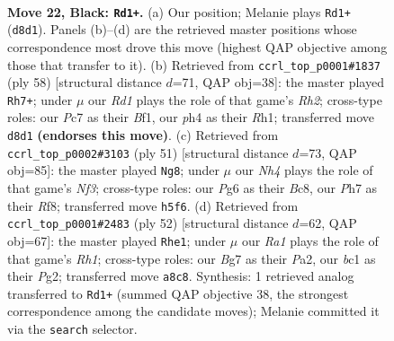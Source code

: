 \documentclass[11pt]{article}
\begin{document}
\clearpage

\begin{figure}[p]\centering
\begin{subfigure}{0.46\textwidth}\centering
\resizebox{\linewidth}{!}{%
\newchessgame
\chessboard[
  setfen={r2r2k1/P1p3bp/1p4p1/5p1n/4pP1P/R5PB/4R3/1NB3K1 b - - 0 22},
  showmover=false,
  pgfstyle=straightmove, color=movearrow, markmove={d8-d1}
]}
\caption{}
\end{subfigure}\hfill
\begin{subfigure}{0.46\textwidth}\centering
\resizebox{\linewidth}{!}{%
\newchessgame
\chessboard[
  setfen={1rr5/3nppk1/4b1p1/p1p5/2P3P1/1P1N1P2/P1K4R/5B1R w - - 4 30},
  showmover=false,
  pgfstyle=straightmove, color=movearrow, markmove={h2-h7}
]}
\caption{}
\end{subfigure}
\\[4pt]
\begin{subfigure}{0.46\textwidth}\centering
\resizebox{\linewidth}{!}{%
\newchessgame
\chessboard[
  setfen={1kb2r2/p2r3p/1p3npR/2pP4/2B3P1/1PN2P2/P7/2K3R1 b - - 8 26},
  showmover=false,
  pgfstyle=straightmove, color=movearrow, markmove={f6-g8}
]}
\caption{}
\end{subfigure}\hfill
\begin{subfigure}{0.46\textwidth}\centering
\resizebox{\linewidth}{!}{%
\newchessgame
\chessboard[
  setfen={2r4r/pp2bk2/4p3/1B2n1p1/4N1Pp/5P2/PP4P1/1K1R3R w - - 3 27},
  showmover=false,
  pgfstyle=straightmove, color=movearrow, markmove={h1-e1}
]}
\caption{}
\end{subfigure}
\caption{\textbf{Move 22, Black: \texttt{Rd1+}.} (a) Our position; Melanie plays \texttt{Rd1+} (\texttt{d8d1}). Panels (b)--(d) are the retrieved master positions whose correspondence most drove this move (highest QAP objective among those that transfer to it). (b) Retrieved from \texttt{ccrl\_top\_p0001\#1837} (ply 58) [structural distance $d$=71, QAP obj=38]: the master played \texttt{Rh7+}; under $\mu$ our \emph{Rd1} plays the role of that game's \emph{Rh2}; cross-type roles: our \emph{P}c7 as their \emph{B}f1, our \emph{p}h4 as their \emph{R}h1; transferred move \texttt{d8d1} \textbf{(endorses this move)}. (c) Retrieved from \texttt{ccrl\_top\_p0002\#3103} (ply 51) [structural distance $d$=73, QAP obj=85]: the master played \texttt{Ng8}; under $\mu$ our \emph{Nh4} plays the role of that game's \emph{Nf3}; cross-type roles: our \emph{P}g6 as their \emph{B}c8, our \emph{P}h7 as their \emph{R}f8; transferred move \texttt{h5f6}. (d) Retrieved from \texttt{ccrl\_top\_p0001\#2483} (ply 52) [structural distance $d$=62, QAP obj=67]: the master played \texttt{Rhe1}; under $\mu$ our \emph{Ra1} plays the role of that game's \emph{Rh1}; cross-type roles: our \emph{B}g7 as their \emph{P}a2, our \emph{b}c1 as their \emph{P}g2; transferred move \texttt{a8c8}. Synthesis: 1 retrieved analog transferred to \texttt{Rd1+} (summed QAP objective 38, the strongest correspondence among the candidate moves); Melanie committed it via the \texttt{search} selector.}
\label{fig:thought-m43}
\end{figure}
\end{document}
